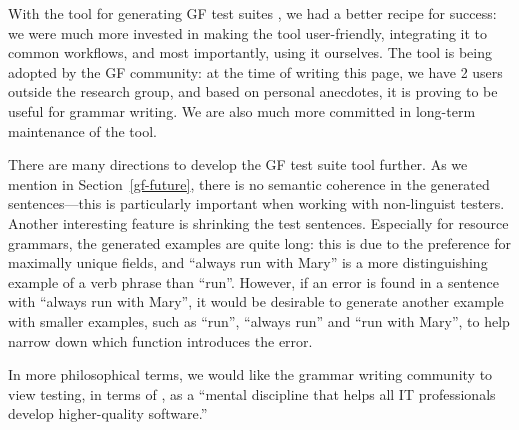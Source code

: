 With the tool for generating GF test suites
\cite{listenmaa_claessen2018}, we had a better recipe for success: we
were much more invested in making the tool user-friendly, integrating
it to common workflows, and most importantly, using it ourselves. The
tool is being adopted by the GF community: at the time of writing this
page, we have 2 users outside the research group, and based on
personal anecdotes, it is proving to be useful for grammar writing. We
are also much more committed in long-term maintenance of the tool.

There are many directions to develop the GF test suite tool further.
As we mention in Section~\ref{gf-future}, there is no semantic
coherence in the generated sentences---this is particularly important
when working with non-linguist testers.  Another interesting feature
is shrinking the test sentences. Especially for resource grammars, the
generated examples are quite long: this is due to the preference for
maximally unique fields, and ``always run with Mary'' is a more
distinguishing example of a verb phrase than ``run''. However, if an
error is found in a sentence with ``always run with Mary'', it would
be desirable to generate another example with smaller examples, such
as ``run'', ``always run'' and ``run with Mary'', to help narrow down
which function introduces the error.

In more philosophical terms, we would like the grammar writing
community to view testing, in terms of \cite{beizer2003software}, as a
``mental discipline that helps all IT professionals develop
higher-quality software.'' 

